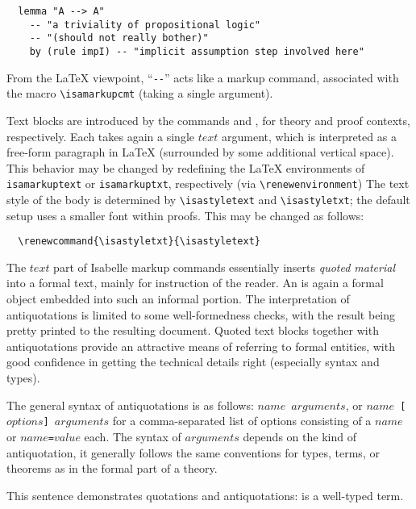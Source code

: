 \begin{isabellebody}
\begin{isamarkuptext}
\begin{verbatim}
  lemma "A --> A"
    -- "a triviality of propositional logic"
    -- "(should not really bother)"
    by (rule impI) -- "implicit assumption step involved here"
\end{verbatim}

  From the {\LaTeX} viewpoint, ``\verb,--,'' acts like a markup
  command, associated with the macro \verb,\isamarkupcmt, (taking a
  single argument).

  \medskip Text blocks are introduced by the commands 
  and , for theory and proof contexts, respectively.
  Each takes again a single $text$ argument, which is interpreted as a
  free-form paragraph in {\LaTeX} (surrounded by some additional
  vertical space).  This behavior may be changed by redefining the
  {\LaTeX} environments of \verb,isamarkuptext, or
  \verb,isamarkuptxt,, respectively (via \verb,\renewenvironment,) The
  text style of the body is determined by \verb,\isastyletext, and
  \verb,\isastyletxt,; the default setup uses a smaller font within
  proofs.  This may be changed as follows:

\begin{verbatim}
  \renewcommand{\isastyletxt}{\isastyletext}
\end{verbatim}

  \medskip The $text$ part of Isabelle markup commands essentially
  inserts \emph{quoted material} into a formal text, mainly for
  instruction of the reader.  An  is again a
  formal object embedded into such an informal portion.  The
  interpretation of antiquotations is limited to some well-formedness
  checks, with the result being pretty printed to the resulting
  document.  Quoted text blocks together with antiquotations provide
  an attractive means of referring to formal entities, with good
  confidence in getting the technical details right (especially syntax
  and types).

  The general syntax of antiquotations is as follows:
  \texttt{{\at}{\ttlbrace}$name$ $arguments${\ttrbrace}}, or
  \texttt{{\at}{\ttlbrace}$name$ [$options$] $arguments${\ttrbrace}}
  for a comma-separated list of options consisting of a $name$ or
  \texttt{$name$=$value$} each.  The syntax of $arguments$ depends on
  the kind of antiquotation, it generally follows the same conventions
  for types, terms, or theorems as in the formal part of a theory.

  \medskip This sentence demonstrates quotations and antiquotations:
   is a well-typed term.


\end{isamarkuptext}
\end{isabellebody}
